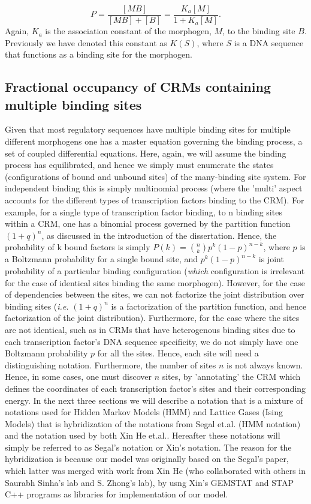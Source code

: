 \begin{equation}\label{}
    P =\frac{[MB]}{[MB] + [B]} = \frac{K_{a}[M]}{1+K_{a}[M]}.
\end{equation}
Again, $K_a$ is the association constant of the morphogen, $M$, to the binding site $B$.  Previously we have denoted this constant as $K(S)$, where $S$ is a DNA sequence that functions as a binding site for the morphogen. 

\subsection{ Fractional occupancy of CRMs containing multiple binding sites }


Given that most regulatory sequences have multiple binding sites for multiple different morphogens one has a master equation governing the binding process, a set of coupled differential equations.  Here, again, we will assume the binding process has equilibrated, and hence we simply must enumerate the states (configurations of bound and unbound sites) of the many-binding site system.  For independent binding this is simply multinomial process (where the 'multi' aspect accounts for the different types of transcription factors binding to the CRM).  For example, for a single type of transcription factor binding, to n binding sites within a CRM, one has a binomial process governed by the partition function $(1+q)^n$, as discussed in the introduction of the dissertation.  Hence, the probability of k bound factors is simply $P(k) =  {n \choose k}p^k(1-p)^{n-k}$, where $p$ is a Boltzmann probability for a single bound site, and $p^k(1-p)^{n-k}$ is joint probability of a particular binding configuration (\emph{which} configuration is irrelevant for the case of identical sites binding the same morphogen).  However, for the case of dependencies between the sites, we can not factorize the joint distribution over binding sites (\textit{i.e.} $(1+q)^n$ is a factorization of the partition function, and hence factorization of the joint distribution).  Furthermore, for the case where the sites are not identical, such as in CRMs that have heterogenous binding sites due to each transcription factor's DNA sequence specificity, we do not simply have one Boltzmann probability $p$ for all the sites.  Hence, each site will need a distinguishing notation.  Furthermore, the number of sites $n$ is not always known.  Hence, in some cases, one must discover $n$ sites, by 'annotating' the CRM which defines the coordinates of each transcription factor's sites and their corresponding energy.  In the next three sections we will describe a notation that is a mixture of notations used for Hidden Markov Models (HMM) and Lattice Gases (Ising Models) that is hybridization of the notations from Segal et.al.\cite{pmid18172436} (HMM notation) and the notation used by both Xin He et.al.\cite{pmid20862354}\cite{pmid19956545}.  Hereafter these notations will simply be referred to as Segal's notation or Xin's notation.  The reason for the hybridization is because our model was originally based on the Segal's paper, which latter was merged with work from Xin He (who collaborated with others in Saurabh Sinha's lab and S. Zhong's lab), by usng Xin's GEMSTAT and STAP C++ programs as libraries for implementation of our model.

